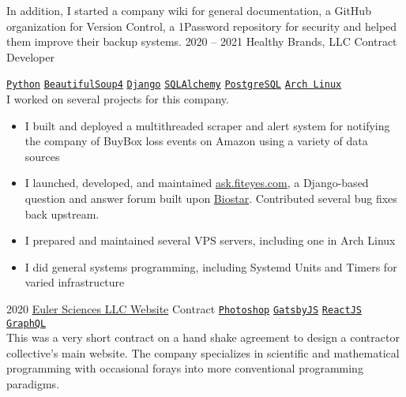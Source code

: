 \documentclass[9pt]{developercv} %
\begin{document}
\begin{entrylist}
{            In addition, I started a company wiki for general documentation, a
            GitHub organization for Version Control, a 1Password repository for
            security and helped them improve their backup systems.
        }
    \entry
        {2020 -- 2021}
        {Healthy Brands, LLC}
        {Contract Developer}
        {
            \texttt{{\href{https://www.python.org/}{Python}}}\slashsep
            \texttt{{\href{https://www.crummy.com/software/BeautifulSoup/bs4/doc/}{BeautifulSoup4}}}\slashsep
            \texttt{{\href{https://www.djangoproject.com/}{Django}}}\slashsep
            \texttt{{\href{https://www.sqlalchemy.org/}{SQLAlchemy}}}\slashsep
            \texttt{{\href{https://www.postgresql.org/}{PostgreSQL}}}\slashsep
            \texttt{{\href{https://archlinux.org/}{Arch Linux}}}\\
            I worked on several projects for this company.
            \begin{itemize}[leftmargin=*, noitemsep]
                \item I built and deployed a multithreaded scraper and alert system for notifying the company of BuyBox loss events on Amazon using a variety of data sources
                \item I launched, developed, and maintained {\href{https://ask.fiteyes.com}{ask.fiteyes.com}}, a Django-based question and answer forum built upon {\href{https://github.com/ialbert/biostar-central}{Biostar}}.  Contributed several bug fixes back upstream.
                \item I prepared and maintained several VPS servers, including one in Arch Linux
                \item I did general systems programming, including Systemd Units and Timers for varied infrastructure
            \end{itemize}
        }
    \entry
        {2020}
        {\href{https://euler-sci.com}{Euler Sciences LLC Website}}
        {Contract}
        {
            \texttt{{\href{https://www.adobe.com/products/photoshop.html}{Photoshop}}}\slashsep
            \texttt{{\href{https://www.gatsbyjs.org/}{GatsbyJS}}}\slashsep
            \texttt{{\href{https://reactjs.org/}{ReactJS}}}\slashsep
            \texttt{{\href{https://graphql.org/}{GraphQL}}}\\
            This was a very short contract on a hand shake agreement to design a
            contractor collective's main website. The company specializes in
            scientific and mathematical programming with occasional forays into
            more conventional programming paradigms.\\

}
\end{entrylist}
\end{document}
